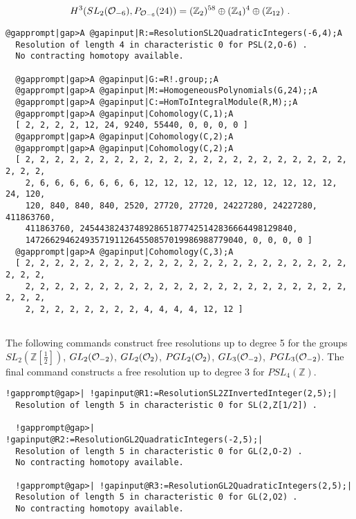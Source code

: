 \documentclass[a4paper,11pt]{report}
\begin{document}
{{\[H^3(SL_2({\cal O}_{-6}),P_{{\cal O}_{-6}}(24)) = (\mathbb Z_2)^{58} \oplus
(\mathbb Z_{4})^4 \oplus (\mathbb Z_{12})\ . \]
 
\begin{Verbatim}[commandchars=@|A,fontsize=\small,frame=single,label=Example]
  @gapprompt|gap>A @gapinput|R:=ResolutionSL2QuadraticIntegers(-6,4);A
  Resolution of length 4 in characteristic 0 for PSL(2,O-6) . 
  No contracting homotopy available. 
  
  @gapprompt|gap>A @gapinput|G:=R!.group;;A
  @gapprompt|gap>A @gapinput|M:=HomogeneousPolynomials(G,24);;A
  @gapprompt|gap>A @gapinput|C:=HomToIntegralModule(R,M);;A
  @gapprompt|gap>A @gapinput|Cohomology(C,1);A
  [ 2, 2, 2, 2, 12, 24, 9240, 55440, 0, 0, 0, 0 ]
  @gapprompt|gap>A @gapinput|Cohomology(C,2);A
  @gapprompt|gap>A @gapinput|Cohomology(C,2);A
  [ 2, 2, 2, 2, 2, 2, 2, 2, 2, 2, 2, 2, 2, 2, 2, 2, 2, 2, 2, 2, 2, 2, 2, 2, 2, 
    2, 6, 6, 6, 6, 6, 6, 6, 12, 12, 12, 12, 12, 12, 12, 12, 12, 12, 24, 120, 
    120, 840, 840, 840, 2520, 27720, 27720, 24227280, 24227280, 411863760, 
    411863760, 2454438243748928651877425142836664498129840, 
    14726629462493571911264550857019986988779040, 0, 0, 0, 0 ]
  @gapprompt|gap>A @gapinput|Cohomology(C,3);A
  [ 2, 2, 2, 2, 2, 2, 2, 2, 2, 2, 2, 2, 2, 2, 2, 2, 2, 2, 2, 2, 2, 2, 2, 2, 2, 
    2, 2, 2, 2, 2, 2, 2, 2, 2, 2, 2, 2, 2, 2, 2, 2, 2, 2, 2, 2, 2, 2, 2, 2, 2, 
    2, 2, 2, 2, 2, 2, 2, 2, 4, 4, 4, 4, 12, 12 ]
  
\end{Verbatim}
 

The following commands construct free resolutions up to degree 5 for the
groups $SL_2(\mathbb Z[\frac{1}{2}])$, $GL_2({\cal O}_{-2})$, $GL_2({\cal O}_{2})$, $PGL_2({\cal O}_{2})$, $GL_3({\cal O}_{-2})$, $PGL_3({\cal O}_{-2})$. The final command constructs a free resolution up to degree 3 for $PSL_4(\mathbb Z)$. 
\begin{Verbatim}[commandchars=!@|,fontsize=\small,frame=single,label=Example]
  !gapprompt@gap>| !gapinput@R1:=ResolutionSL2ZInvertedInteger(2,5);|
  Resolution of length 5 in characteristic 0 for SL(2,Z[1/2]) . 
  
  !gapprompt@gap>| !gapinput@R2:=ResolutionGL2QuadraticIntegers(-2,5);|
  Resolution of length 5 in characteristic 0 for GL(2,O-2) . 
  No contracting homotopy available. 
  
  !gapprompt@gap>| !gapinput@R3:=ResolutionGL2QuadraticIntegers(2,5);|
  Resolution of length 5 in characteristic 0 for GL(2,O2) . 
  No contracting homotopy available. 
  

\end{Verbatim}}}
\end{document}

